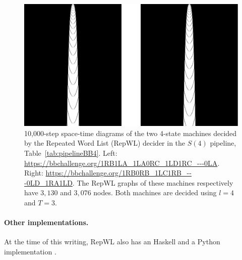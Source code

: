 \begin{figure}
    \centering
    \includegraphics[scale=0.48]{figures/RepWL/RepWL_BB4_two_machines.pdf}
    \caption{10,000-step space-time diagrams of the two 4-state machines decided by the Repeated Word List (RepWL) decider in the $S(4)$ pipeline, Table~\ref{tab:pipelineBB4}. Left: {\small \url{https://bbchallenge.org/1RB1LA_1LA0RC_1LD1RC_---0LA}}. Right: {\small \url{https://bbchallenge.org/1RB0RB_1LC1RB_---0LD_1RA1LD}}. The RepWL graphs of these machines respectively have $3{,}130$ and $3{,}076$ nodes. Both machines are decided using $l=4$ and $T=3$.
    }\label{fig:RepWLBB4}
\end{figure}

\paragraph{Other implementations.} At the time of this writing, RepWL also has an Haskell and a Python implementation \cite{RepWL_haskell,RepWL_python}.